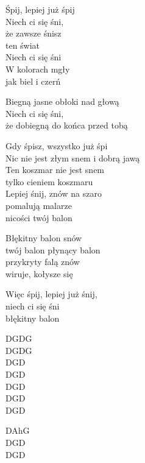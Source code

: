 \begin{text}
    Śpij, lepiej już śpij\\
    Niech ci się śni,\\
    że zawsze śnisz\\
    ten świat\\
    Niech ci się śni\\
    W kolorach mgły\\
    jak biel i czerń

    Biegną jasne obłoki nad głową\\
    Niech ci się śni,\\
    że dobiegną do końca przed tobą

    Gdy śpisz, wszystko już śpi\\
    Nic nie jest złym snem i dobrą jawą\\
    Ten koszmar nie jest snem\\
    tylko cieniem koszmaru\\
    Lepiej śnij, znów na szaro\\
    pomalują malarze\\
    nicości twój balon

    Błękitny balon snów\\
    twój balon płynący balon\\
    przykryty falą znów\\
    wiruje, kołysze się

    Więc śpij, lepiej już śnij,\\
    niech ci się śni\\
    błękitny balon
\end{text}
\begin{chord}
    DGDG\\
    DGDG\\
    DGD\\
    DGD\\
    DGD\\
    DGD\\
    DGD

    DAhG\\
    DGD\\
    DGD
\end{chord}
